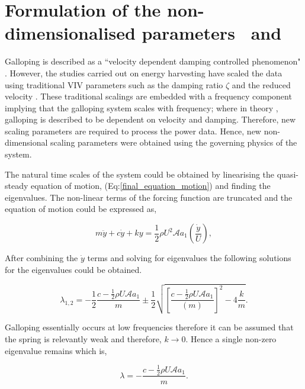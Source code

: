 \section{Formulation of the non-dimensionalised parameters \massstiff \ and \massdamp }
\label{sec: pi_1,pi_2_formulation}

Galloping is described as a ``velocity dependent damping controlled phenomenon" \citep{Paidoussis2010}. However, the studies carried out on energy harvesting have scaled the data using traditional VIV parameters such as the damping ratio $\zeta$ and the reduced velocity \ustar \citep{Barrero-Gil2010a}. These traditional scalings are embedded with a frequency component implying that the galloping system scales with frequency; where in theory \citep{Paidoussis2010}, galloping is described to be dependent on velocity and damping. Therefore, new scaling parameters are required to process the power data. Hence, new non-dimensional scaling parameters were obtained using the governing physics of the system.      

The natural time scales of the system could be obtained by linearising the quasi-steady equation of motion, (Eq:\ref{final_equation_motion}) and finding the eigenvalues. The non-linear terms of the forcing function are truncated and the equation of motion could be expressed as, 

\begin{equation}
\label{eqn:eom_linear}
m\ddot{y}{+}c\dot{y}{+}ky{=}\frac{1}{2}\rho U^2 \mathcal{A} a_1\left(\frac{\dot{y}}{U}\right),
\end{equation}

After combining the $\dot{y}$ terms and solving for eigenvalues the following solutions for the eigenvalues could be obtained. 

 \begin{equation}
 \label{eqn:eigs}
 \lambda_{1,2}= -\frac{1}{2}\frac{c-\frac{1}{2}\rho U\mathcal{A}a_1}{m}\pm\frac{1}{2}\sqrt{\left[\frac{c-\frac{1}{2}\rho U\mathcal{A}a_1}{(m)}\right]^2-4\frac{k}{m}}.
 \end{equation} 
 
 Galloping essentially occurs at low frequencies therefore it can be assumed that the spring is relevantly weak and therefore, $k \rightarrow 0$. Hence a single non-zero eigenvalue remains which is, 
  
  \begin{equation}
  \label{eqn:eigs_nospring}
  \lambda=-\frac{c-\frac{1}{2}\rho U\mathcal{A}a_1}{m}.
  \end{equation}
  
